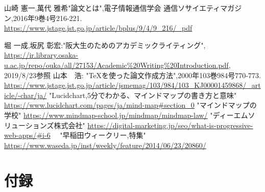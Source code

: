 \documentclass[a4j,12pt]{jarticle}
\begin{document}
 \begin{thebibliography}{99}
山崎 憲一,萬代 雅希"論文とは",電子情報通信学会 通信ソサイエティマガジン,2016年9巻4号216-221.
\url{https://www.jstage.jst.go.jp/article/bplus/9/4/9_216/_pdf}

 堀 一成,坂尻 彰宏:"阪大生のためのアカデミックライティング",
\url{https://ir.library.osaka-u.ac.jp/repo/ouka/all/27153/Academic%20Writing%20Introduction.pdf}, 2019/8/23参照
 山本　浩: "TeXを使った論文作成方法",2000年103巻984号770-773.
\url{https://www.jstage.jst.go.jp/article/jsmemag/103/984/103_KJ00001459868/_article/-char/ja/}
 "Lucidchart,5分でわかる、マインドマップの書き方と意味"
\url{https://www.lucidchart.com/pages/ja/mind-map#section_0}
 "マインドマップの学校"
\url{https://www.mindmap-school.jp/mindmap/mindmap-law/}
 "ディーエムソリューションズ株式会社"
\url{https://digital-marketing.jp/seo/what-is-progressive-web-apps/#i-6}
　"早稲田ウィークリー,特集"
\url{https://www.waseda.jp/inst/weekly/feature/2014/06/23/20860/}
\end{thebibliography}
\newpage
\section*{付録}

\end{document}
